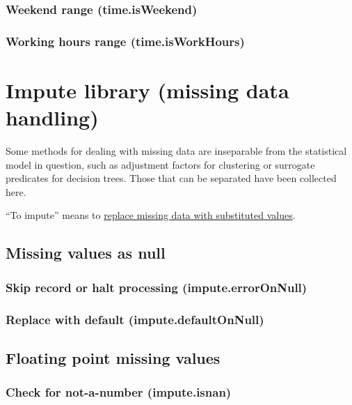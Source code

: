 \documentclass{article}
\theoremstyle{definition}
\begin{document}
\subsubsection{Weekend range (time.isWeekend)}

\subsubsection{Working hours range (time.isWorkHours)}

\pagebreak

\hypertarget{hsec:impute}{}
\section{Impute library (missing data handling)}
\label{sec:impute}

Some methods for dealing with missing data are inseparable from the statistical model in question, such as adjustment factors for clustering or surrogate predicates for decision trees.  Those that can be separated have been collected here.

``To impute'' means to \href{http://en.wikipedia.org/wiki/Imputation_(statistics)}{replace missing data with substituted values}.

\subsection{Missing values as null}

\subsubsection{Skip record or halt processing (impute.errorOnNull)}

\subsubsection{Replace with default (impute.defaultOnNull)}

\subsection{Floating point missing values}

\subsubsection{Check for not-a-number (impute.isnan)}
\end{document}
